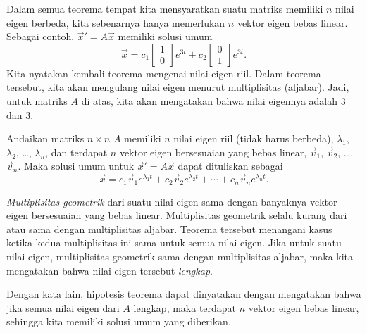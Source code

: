 Dalam semua
teorema tempat kita mensyaratkan suatu matriks memiliki $n$ nilai eigen berbeda, kita sebenarnya hanya
memerlukan $n$ vektor eigen bebas linear.  Sebagai contoh,
${\vec{x}}' = A\vec{x}$ memiliki solusi umum
\begin{equation*}
\vec{x} = 
c_1 \begin{bmatrix} 1 \\ 0 \end{bmatrix} e^{3t}
+ c_2 \begin{bmatrix} 0 \\ 1 \end{bmatrix} e^{3t} .
\end{equation*}
Kita nyatakan kembali teorema mengenai nilai eigen riil.  Dalam teorema tersebut,
kita akan mengulang nilai eigen menurut multiplisitas (aljabar).  Jadi,
untuk matriks $A$ di atas, kita akan mengatakan bahwa nilai eigennya adalah 3 dan 3.

\begin{theorem}
Andaikan matriks $n \times n$ $A$ 
memiliki $n$ nilai eigen riil (tidak harus berbeda), $\lambda_1$,
$\lambda_2$, \ldots, $\lambda_n$,
dan terdapat $n$ vektor eigen bersesuaian yang bebas linear,
$\vec{v}_1$, $\vec{v}_2$, \ldots, $\vec{v}_n$.  Maka solusi umum untuk 
${\vec{x}}' = A\vec{x}$
dapat dituliskan sebagai
\begin{equation*}
\vec{x} = c_1 \vec{v}_1 e^{\lambda_1 t} +
c_2 \vec{v}_2 e^{\lambda_2 t} + \cdots +
c_n \vec{v}_n e^{\lambda_n t} .
\end{equation*}
\end{theorem}

\emph{Multiplisitas geometrik} dari suatu nilai eigen
sama dengan banyaknya vektor eigen bersesuaian yang bebas linear.
Multiplisitas geometrik selalu kurang dari atau
sama dengan multiplisitas aljabar.  Teorema tersebut menangani kasus
ketika kedua multiplisitas ini sama untuk semua nilai eigen.
Jika untuk suatu nilai eigen, multiplisitas geometrik sama
dengan multiplisitas aljabar, maka kita mengatakan bahwa nilai eigen tersebut
\emph{lengkap}.

Dengan kata lain, 
hipotesis teorema dapat dinyatakan dengan mengatakan bahwa jika semua
nilai eigen dari $A$ lengkap, maka terdapat $n$ vektor eigen bebas linear,
sehingga kita memiliki solusi umum yang diberikan.

\medskip

